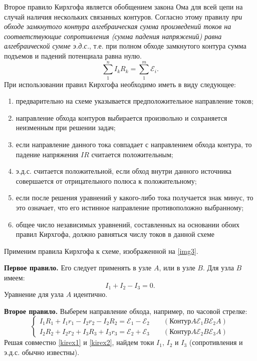 \documentclass[a4paper,10pt]{book}
\begin{document}
Второе правило Кирхгофа является обобщением закона Ома для всей цепи на случай наличия нескольких связанных контуров. Согласно этому правилу
\emph{при обходе замкнутого контура алгебраическая сумма произведений токов на соответствующие сопротивления (сумма падения напряжений) равна
алгебраической сумме э.д.с.}, т.е. при полном обходе замкнутого контура сумма подъемов и падений потенциала равна нулю.
\begin{equation}\label{kirchgoff2}
 \sum_1^n I_kR_k = \sum_1^m\mathcal{E}_i.
\end{equation}
При использовании правил Кирхгофа необходимо иметь в виду следующее:
\begin{enumerate}
 \item предварительно на схеме указывается предположительное направление токов;
 \item направление обхода контуров выбирается произвольно и сохраняется неизменным при решении задач;
 \item если направление данного тока совпадает с направлением обхода контура, то падение напряжения $IR$ считается положительным;
 \item э.д.с. считается положительной, если обход внутри данного источника совершается от отрицательного полюса к положительному;
 \item если после решения уравнений у какого-либо тока получается знак минус, то это означает, что его истинное направление противоположно выбранному;
 \item общее число независимых уравнений, составленных на основании обоих правил Кирхгофа, должно равняться числу токов в данной схеме
\end{enumerate}

Применим правила Кирхгофа к схеме, изображенной на \ref{img3}.

\textbf{Первое правило.} Его следует применять в узле $A$, или в узле $B$. Для узла $B$ имеем:
\begin{equation}\label{kirex1}
 I_1 + I_2 - I_3 = 0.
\end{equation}
Уравнение для узла $A$ идентично.

\textbf{Второе правило.} Выберем направление обхода, например, по часовой стрелке:
\begin{equation}\label{kirex2}
 \begin{cases}
    I_1R_1 + I_1r_1 - I_2r_2 - I_2R_2 = \mathcal{E}_1 - \mathcal{E}_2 \;\;\;\;\;\;\;(\text{Контур} A\mathcal{E}_1B\mathcal{E}_2A)\\
    I_2R_2 + I_2r_2 + I_3R_3 + I_3r_3 = \mathcal{E}_2 + \mathcal{E}_3 \;\;\;\;\;\;\;(\text{Контур} A\mathcal{E}_2B\mathcal{E}_3A)
 \end{cases}
\end{equation}
Решая совместно \ref{kirex1} и \ref{kirex2}, найдем токи $I_1$, $I_2$ и $I_3$ (сопротивления и э.д.с. обычно известны).
\end{document}
